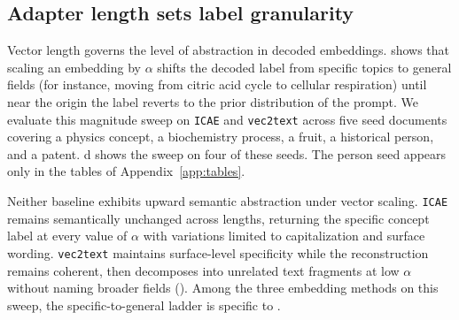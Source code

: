 \subsection{Adapter length sets label granularity}
\label{app:length-dial}

Vector length governs the level of abstraction in decoded \doctolora embeddings.
 shows that scaling an embedding by $\alpha$ shifts the decoded label from specific topics to general fields (for instance, moving from citric acid cycle to cellular respiration) until near the origin the label reverts to the prior distribution of the prompt.
We evaluate this magnitude sweep on \texttt{ICAE} and \texttt{vec2text} across five seed documents covering a physics concept, a biochemistry process, a fruit, a historical person, and a patent.
d shows the \doctolora sweep on four of these seeds.
The person seed appears only in the tables of Appendix~\ref{app:tables}.

Neither baseline exhibits upward semantic abstraction under vector scaling.
\texttt{ICAE} remains semantically unchanged across lengths, returning the specific concept label at every value of $\alpha$ with variations limited to capitalization and surface wording.
\texttt{vec2text} maintains surface-level specificity while the reconstruction remains coherent, then decomposes into unrelated text fragments at low $\alpha$ without naming broader fields ().
Among the three embedding methods on this sweep, the specific-to-general ladder is specific to \doctolora.
